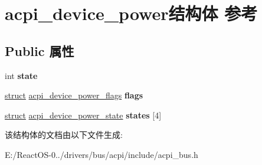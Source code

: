 \hypertarget{structacpi__device__power}{}\section{acpi\+\_\+device\+\_\+power结构体 参考}
\label{structacpi__device__power}
\subsection*{Public 属性}
\begin{DoxyCompactItemize}
\item 
\mbox{\label{structacpi__device__power_abd69538f6375dc03f02264cacf451e26}} 
int {\bfseries state}
\item 
\mbox{\label{structacpi__device__power_a537720afeb2f988c8463bdc271c7abbd}} 
\hyperlink{interfacestruct}{struct} \hyperlink{structacpi__device__power__flags}{acpi\+\_\+device\+\_\+power\+\_\+flags} {\bfseries flags}
\item 
\mbox{\label{structacpi__device__power_afa07ffd559f56444b94eba217a27b2ce}} 
\hyperlink{interfacestruct}{struct} \hyperlink{structacpi__device__power__state}{acpi\+\_\+device\+\_\+power\+\_\+state} {\bfseries states} \mbox{[}4\mbox{]}
\end{DoxyCompactItemize}


该结构体的文档由以下文件生成\+:\begin{DoxyCompactItemize}
\item 
E\+:/\+React\+O\+S-\/0../drivers/bus/acpi/include/acpi\+\_\+bus.\+h\end{DoxyCompactItemize}
